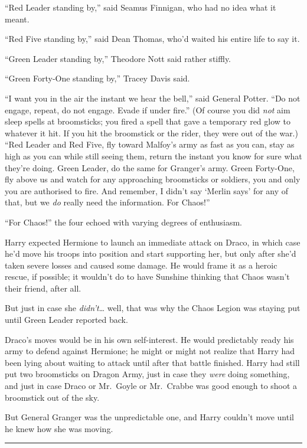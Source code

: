 ``Red Leader standing by,'' said Seamus Finnigan, who had no idea what
it meant.

``Red Five standing by,'' said Dean Thomas, who'd waited his entire life
to say it.

``Green Leader standing by,'' Theodore Nott said rather stiffly.

``Green Forty-One standing by,'' Tracey Davis said.

``I want you in the air the instant we hear the bell,'' said General
Potter. ``Do not engage, repeat, do not engage. Evade if under fire.''
(Of course you did \emph{not} aim sleep spells at broomsticks; you fired
a spell that gave a temporary red glow to whatever it hit. If you hit
the broomstick or the rider, they were out of the war.) ``Red Leader and
Red Five, fly toward Malfoy's army as fast as you can, stay as high as
you can while still seeing them, return the instant you know for sure
what they're doing. Green Leader, do the same for Granger's army. Green
Forty-One, fly above us and watch for any approaching broomsticks or
soldiers, you and only you are authorised to fire. And remember, I
didn't say `Merlin says' for any of that, but we \emph{do} really need
the information. For Chaos!''

``For Chaos!'' the four echoed with varying degrees of enthusiasm.

Harry expected Hermione to launch an immediate attack on Draco, in which
case he'd move his troops into position and start supporting her, but
only after she'd taken severe losses and caused some damage. He would
frame it as a heroic rescue, if possible; it wouldn't do to have
Sunshine thinking that Chaos wasn't their friend, after all.

But just in case she \emph{didn't}\ldots{} well, that was why the Chaos
Legion was staying put until Green Leader reported back.

Draco's moves would be in his own self-interest. He would predictably
ready his army to defend against Hermione; he might or might not realize
that Harry had been lying about waiting to attack until after that
battle finished. Harry had still put two broomsticks on Dragon Army,
just in case they \emph{were} doing something, and just in case Draco or
Mr.~Goyle or Mr.~Crabbe was good enough to shoot a broomstick out of the
sky.

But General Granger was the unpredictable one, and Harry couldn't move
until he knew how she was moving.

\begin{center}\rule{3in}{0.4pt}\end{center}

